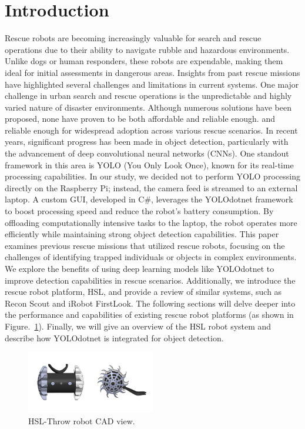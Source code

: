 \documentclass[conference]{IEEEtran}
\begin{document}
\section{Introduction}
Rescue robots are becoming increasingly valuable for search and rescue operations due to their ability to navigate rubble and hazardous environments. Unlike dogs or human responders, these robots are expendable, making them ideal for initial assessments in dangerous areas. Insights from past rescue missions have highlighted several challenges and limitations in current systems. One major challenge in urban search and rescue operations is the unpredictable and highly varied nature of disaster environments. Although numerous solutions have been proposed, none have proven to be both affordable and reliable enough. and reliable enough for widespread adoption across various rescue scenarios. In recent years, significant progress has been made in object detection, particularly with the advancement of deep convolutional neural networks (CNNs). One standout framework in this area is YOLO (You Only Look Once), known for its real-time processing capabilities. In our study, we decided not to perform YOLO processing directly on the Raspberry Pi; instead, the camera feed is streamed to an external laptop. A custom GUI, developed in C\#, leverages the YOLOdotnet framework to boost processing speed and reduce the robot's battery consumption. By offloading computationally intensive tasks to the laptop, the robot operates more efficiently while maintaining strong object detection capabilities. This paper examines previous rescue missions that utilized rescue robots, focusing on the challenges of identifying trapped individuals or objects in complex environments. We explore the benefits of using deep learning models like YOLOdotnet to improve detection capabilities in rescue scenarios. Additionally, we introduce the rescue robot platform, HSL, and provide a review of similar systems, such as Recon Scout and iRobot FirstLook. The following sections will delve deeper into the performance and capabilities of existing rescue robot platforms (as shown in Figure.~\ref{fig_First}). Finally, we will give an overview of the HSL robot system and describe how YOLOdotnet is integrated for object detection.

\begin{figure}[htbp]
\centerline{\includegraphics[width=0.5\textwidth]{Fig_First.PNG}}
\caption{HSL-Throw robot CAD view.}
\label{fig_First}
\end{figure}
\end{document}
